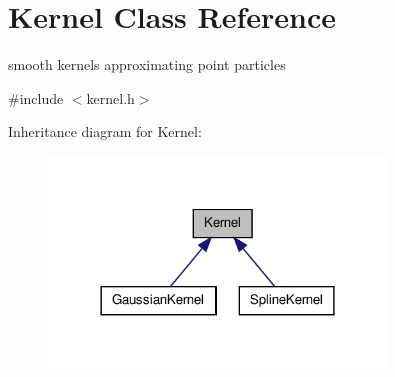 \hypertarget{classKernel}{\section{\-Kernel \-Class \-Reference}
\label{classKernel}
}


smooth kernels approximating point particles  




{\ttfamily \#include $<$kernel.\-h$>$}



\-Inheritance diagram for \-Kernel\-:
\nopagebreak
\begin{figure}[H]
\begin{center}
\leavevmode
\includegraphics[width=254pt]{classKernel__inherit__graph}
\end{center}
\end{figure}
